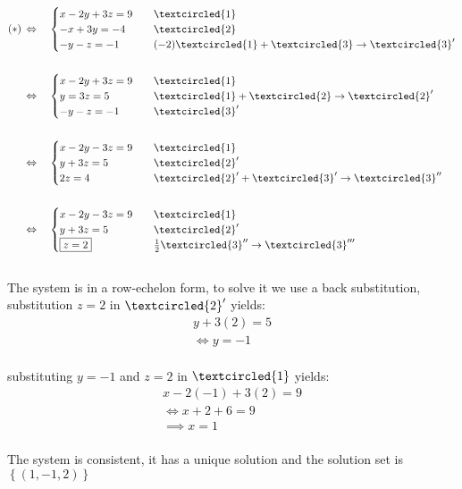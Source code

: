\documentclass{jhwhw}
\begin{document}
\begin{align*} 
(\ast) \, &\Leftrightarrow \quad \begin{cases} x-2y+3z=9 & \quad \textcircled{1} \\ -x+3y=-4 & \quad \textcircled{2} \\ -y-z=-1 & \quad (-2)\textcircled{1} + \textcircled{3} \rightarrow \textcircled{3}' \end{cases}
\\ \\
&\Leftrightarrow \quad \begin{cases} x-2y+3z=9 & \quad \textcircled{1} \\ y=3z=5 & \quad \textcircled{1} + \textcircled{2} \rightarrow \textcircled{2}' \\ -y-z=-1 & \quad \textcircled{3}' \end{cases}
\\ \\
&\Leftrightarrow \quad \begin{cases} x-2y-3z=9 & \quad \textcircled{1} \\ y+3z=5 & \quad \textcircled{2}' \\ 2z=4 & \quad \textcircled{2}' + \textcircled{3}' \rightarrow \textcircled{3}''\end{cases}
\\ \\
&\Leftrightarrow \quad \begin{cases} x-2y-3z=9 & \quad \textcircled{1} \\ y+3z=5 & \quad \textcircled{2}' \\ \boxed{z=2} & \quad \frac{1}{2}\textcircled{3}'' \rightarrow \textcircled{3}''' \end{cases}
\end{align*}
\\

The system is in a row-echelon form, to solve it we use a back substitution, substitution \(z=2\) in \(\textcircled{2}'\) yields:
\\

\begin{align*} 
y+3(2)=5\\
\Leftrightarrow \boxed{y=-1}
\end{align*}
\\

substituting \(y=-1\) and \(z=2\) in \(\textcircled{1}\) yields:
\\

\begin{align*} 
x-2(-1)+3(2)=9\\
\Leftrightarrow x+2+6=9\\
\implies \boxed{x=1}
\end{align*}
\\
The system is consistent, it has a unique solution and the solution set is \(\left\{(1,-1,2)\right\}\)
\\ \\
\end{document}
